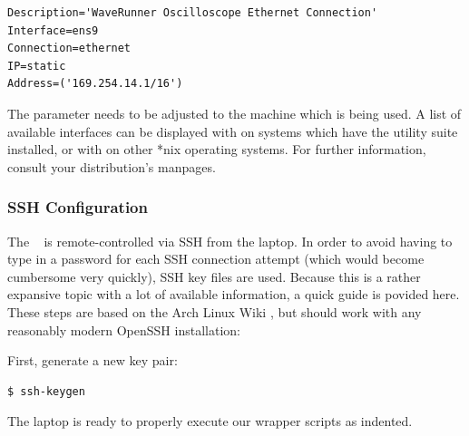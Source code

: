 \begin{verbatim}
Description='WaveRunner Oscilloscope Ethernet Connection'
Interface=ens9                                                                                                                                                                                            
Connection=ethernet                                                                                                                                                                                       
IP=static                                                                                                                                                                                                 
Address=('169.254.14.1/16')                                                                                                                                                                               
\end{verbatim}


The   parameter  needs to  be  adjusted to  the machine  which
is  being  used. A  list  of   available  interfaces  can  be  displayed  with
  on  systems  which have  the    utility  suite
\cite{ref:iproute2}  installed,  or with    \cite{ref:ifconfig}
on  other  *nix  operating  systems. For  further  information,  consult  your
distribution's manpages.


\subsubsection{SSH Configuration}
\label{subsubsec:laptop:sshconf}

The \raspi~  is remote-controlled via SSH  from the laptop. In order  to avoid
having to  type in  a password  for each SSH  connection attempt  (which would
become cumbersome  very quickly), SSH  key files  are used. Because this  is a
rather expansive topic  with a lot of available information,  a quick guide is
povided  here\footnotemark. These  steps are  based  on  the Arch  Linux  Wiki
\cite{ref:archWiki:SSH} , but  should work with any  reasonably modern OpenSSH
installation:



First, generate a new key pair:

\begin{verbatim}
$ ssh-keygen
\end{verbatim}

The laptop is ready to properly execute our wrapper scripts as indented.
